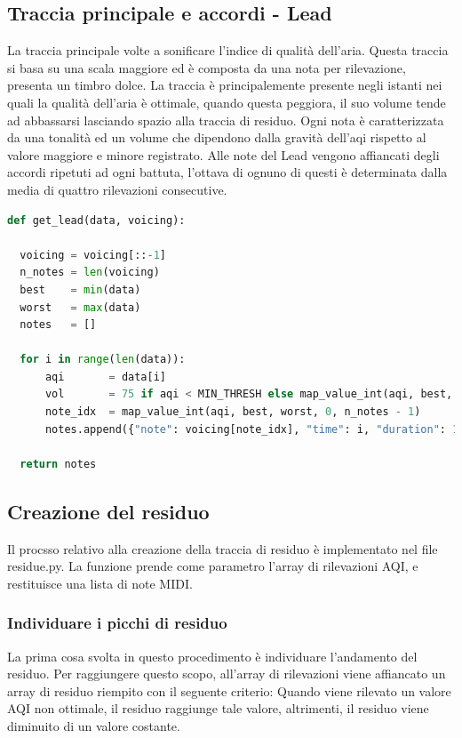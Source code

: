 \subsection{Traccia principale e accordi - Lead}
La traccia principale volte a sonificare l'indice di qualità dell'aria.
Questa traccia si basa su una scala maggiore ed è composta da una nota per rilevazione, presenta un timbro dolce.
La traccia è principalemente presente negli istanti nei quali la qualità dell'aria è ottimale, quando questa peggiora,
il suo volume tende ad abbassarsi lasciando spazio alla traccia di residuo.
Ogni nota è caratterizzata da una tonalità ed un volume che dipendono dalla gravità dell'aqi rispetto al valore maggiore e minore registrato.
Alle note del Lead vengono affiancati degli accordi ripetuti ad ogni battuta, l'ottava di ognuno di questi è determinata dalla media di quattro rilevazioni consecutive.
\begin{lstlisting}[language=Python]
def get_lead(data, voicing):

  voicing = voicing[::-1]
  n_notes = len(voicing)
  best    = min(data)
  worst   = max(data)
  notes   = []

  for i in range(len(data)):
      aqi       = data[i]
      vol       = 75 if aqi < MIN_THRESH else map_value_int(aqi, best, worst, 50, 25)
      note_idx  = map_value_int(aqi, best, worst, 0, n_notes - 1)
      notes.append({"note": voicing[note_idx], "time": i, "duration": 1, "volume": vol })

  return notes
\end{lstlisting}








\subsection{Creazione del residuo}
Il procsso relativo alla creazione della traccia di residuo è implementato nel file residue.py.
La funzione prende come parametro l'array di rilevazioni AQI, e restituisce una lista di note MIDI.
\subsubsection{Individuare i picchi di residuo}
La prima cosa svolta in questo procedimento è individuare l'andamento del residuo.
Per raggiungere questo scopo, all'array di rilevazioni viene affiancato un array di residuo riempito con il seguente criterio:
Quando viene rilevato un valore AQI non ottimale, il residuo raggiunge tale valore, altrimenti, il residuo viene diminuito di un valore costante.
